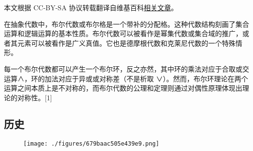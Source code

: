 
本文根据 CC-BY-SA 协议转载翻译自维基百科\href{https://en.wikipedia.org/wiki/Boolean_algebra_(structure)}{相关文章}。

在抽象代数中，布尔代数或布尔格是一个带补的分配格。这种代数结构刻画了集合运算和逻辑运算的基本性质。布尔代数可以被看作是幂集代数或集合域的推广，或者其元素可以被看作是广义真值。它也是德摩根代数和克莱尼代数的一个特殊情形。

每一个布尔代数都可以产生一个布尔环，反之亦然，其中环的乘法对应于合取或交运算∧，环的加法对应于异或或对称差（不是析取 ∨）。然而，布尔环理论在两个运算之间本质上是不对称的，而布尔代数的公理和定理则通过对偶性原理体现出理论的对称性。[1]
\subsection{历史}
\begin{figure}[ht]
\centering
\texttt{[image: ./figures/679baac505e439e9.png]}
\caption{} \label{fig_BRds_1}
\end{figure}